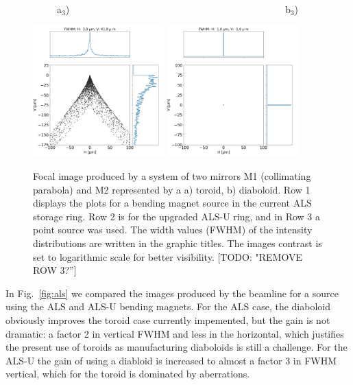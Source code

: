 \documentclass{iucr}              %
\newcommand{\todo}[1]{{\color{red}[TODO: "#1'']}}
\begin{document}
\begin{figure}
\flushleft
~~~~~a$_3$)~~~~~~~~~~~~~~~~~~~~~~~~~~~~~~~~~~~~~~~~~~~~~b$_3$) \\
\centering

\includegraphics[width=0.45\textwidth]{figures/bl_point_toroid.png} 
\includegraphics[width=0.45\textwidth]{figures/bl_point_diaboloid-exact.png}  \\
\caption{Focal image produced by a system of two mirrors M1 (collimating parabola) and M2 represented by a a) toroid, b) diaboloid. Row 1 displays the plots for a bending magnet source in the current ALS storage ring. Row 2 is for the upgraded ALS-U ring, and in Row 3 a point source was used. The width values (FWHM) of the intensity distributions are written in the graphic titles. The images contrast is set to logarithmic scale for better visibility. \todo{REMOVE ROW 3?}
}
\end{figure}

In Fig.~\ref{fig:als} we compared the images produced by the beamline for a source using the ALS and ALS-U bending magnets. For the ALS case, the diaboloid obviously improves the toroid case currently impemented, but the gain is not dramatic: a factor 2 in vertical FWHM and less in the horizontal, which justifies the present use of toroids as manufacturing diaboloids is still a challenge. For the ALS-U the gain of using a diabloid is increased to almost a factor 3 in FWHM vertical, which for the toroid is dominated by aberrations.
\end{document}
